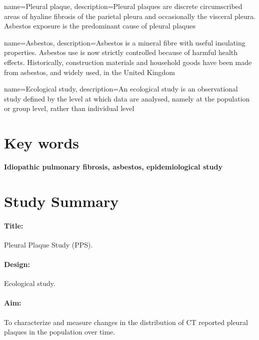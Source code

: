 \documentclass[a4paper,10pt]{article}
\begin{document}
\newpage
 
\tableofcontents

\newpage

  {name=Pleural plaque,
   description={Pleural plaques are discrete circumscribed areas of hyaline fibrosis of the parietal pleura and occasionally the visceral pleura. Asbestos exposure is the predominant cause of pleural plaques}}

  {name=Asbestos,
   description={Asbestos is a mineral fibre with useful insulating properties. Asbestos use is now strictly controlled because of harmful health effects. Historically, construction materials and household goods have been made from asbestos, and widely used, in the United Kingdom}}

  {name=Ecological study,
  description={An ecological study is an observational study defined by the level at which data are analysed, namely at the population or group level, rather than individual level}}


\glsaddall

\printglossary[nonumberlist]

\section*{Key words}

\textbf{Idiopathic pulmonary fibrosis, asbestos, epidemiological study}

\newpage

\section*{Study Summary}

\paragraph{Title:} Pleural Plaque Study (PPS).
\paragraph{Design:} Ecological study.
\paragraph{Aim:} To characterize and measure changes in the distribution of CT reported pleural plaques in the population over time.
\end{document}

